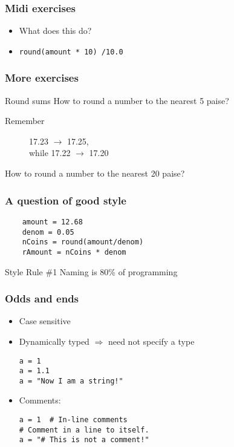 \documentclass[14pt,compress]{beamer}
\newcounter{time}
\newcommand{\inctime}[1]{\addtocounter{time}{#1}{\tiny \thetime\ m}}
\begin{document}
\begin{frame}\frametitle{Midi exercises}
  \begin{center}
    \begin{itemize}
      \item What does this do?
      \item \texttt{round(amount * 10) /10.0 }
    \end{itemize}
  \end{center}
\end{frame}

\begin{frame}\frametitle{More exercises}
  \begin{center}
    \begin{block}{Round sums}
      How to round a number to the nearest  5 paise?\\
      \begin{description}
        \item[Remember] 17.23 $\rightarrow$ 17.25,\\ while 17.22 $\rightarrow$ 17.20\\
      \end{description}
      How to round a number to the nearest 20 paise?
    \end{block}
  \end{center}
\end{frame}

\begin{frame}[fragile] \frametitle{A question of good style}
  \begin{lstlisting}
    amount = 12.68
    denom = 0.05
    nCoins = round(amount/denom)
    rAmount = nCoins * denom
  \end{lstlisting}
  \pause
  \begin{block}{Style Rule \#1}
    Naming is 80\% of programming
  \end{block}
\end{frame}


\begin{frame}[fragile]
  \frametitle{Odds and ends}
  \begin{itemize}
    \item Case sensitive
    \item Dynamically typed $\Rightarrow$ need not specify a type
      \begin{lstlisting}
a = 1
a = 1.1
a = "Now I am a string!"
      \end{lstlisting}
    \item Comments:
      \begin{lstlisting}
a = 1  # In-line comments
# Comment in a line to itself.
a = "# This is not a comment!"
      \end{lstlisting}
  \end{itemize}
  \inctime{15}
\end{frame}
\end{document}
